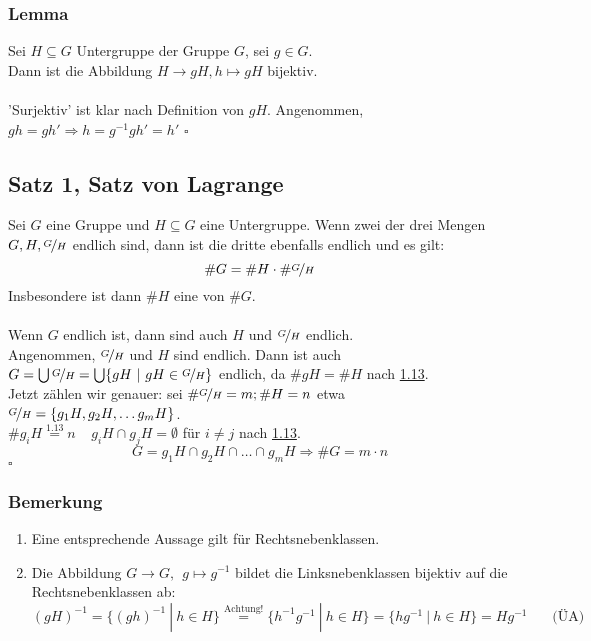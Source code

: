 \subsubsection*{Lemma}
Sei $H\subseteq G$ Untergruppe der Gruppe $G$, sei $g \in G$.\\
Dann ist die Abbildung $H \to gH, h \mapsto gH$ bijektiv.\\

\\
'Surjektiv' ist klar nach Definition von $gH$. 
Angenommen, $gh=gh' \Rightarrow h=g^{-1}gh'=h'$
\hfill $\square$

\subsection{Satz 1, Satz von Lagrange}
\label{sub:satz_von_lagrange}
Sei $G$ eine Gruppe und $H\subseteq G$ eine Untergruppe. 
Wenn zwei der drei Mengen $G,H,\nicefrac{G}{H}$ endlich sind, dann ist die dritte ebenfalls endlich und es gilt:\\
\[
\#G=\#H \cdot \#\nicefrac{G}{H} 
\]
Insbesondere ist dann $\#H$ eine  von $\#G$.\\
\vfill
{}\\
Wenn $G$ endlich ist, dann sind auch $H$ und $\nicefrac{G}{H}$ endlich.\\
Angenommen, $\nicefrac{G}{H}$ und $H$ sind endlich. Dann ist auch $G= \bigcup \nicefrac{G}{H}=\bigcup\{gH~|~gH\in \nicefrac{G}{H} \}$ endlich, da $\#gH=\#H$ nach \hyperref[sub:nebenklassen]{1.13}.\\
Jetzt zählen wir genauer: sei $\#\nicefrac{G}{H}=m; \#H=n$ etwa $\nicefrac{G}{H}=\{g_1H,g_2H,\dots g_mH \}$.\\
$\#g_iH\stackrel{\hyperref[sub:nebenklassen]{1.13}}{=}n~~~~~g_iH\cap g_jH=\emptyset$ für $i\not=j$ nach \hyperref[sub:nebenklassen]{1.13}.\\
\[
G=g_1H\cap g_2H\cap \dots \cap g_mH \Rightarrow \#G=m\cdot n
\]
\hfill $\square$

\subsubsection*{Bemerkung}
\begin{enumerate}[(1)]
	\item Eine entsprechende Aussage gilt für Rechtsnebenklassen.
	\item Die Abbildung $G \to G,~~g\mapsto g^{-1}$ bildet die Linksnebenklassen bijektiv auf die Rechtsnebenklassen ab:
	\[
	(gH)^{-1}=\{(gh)^{-1}~|~h \in H \} \stackrel{\text{Achtung!}}{=}\{h^{-1}g^{-1}~|~h \in H \}=\{hg^{-1}~|~h\in H \}=Hg^{-1}~~~~~~~~\text{(ÜA)}
	\]
\end{enumerate}

